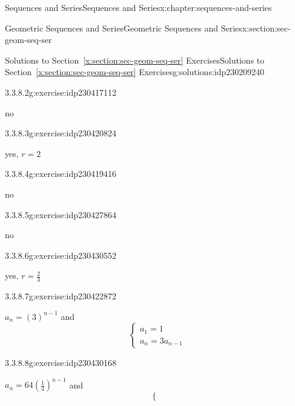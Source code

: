 \documentclass[twoside,10pt,]{book}
\newcommand{\xreffont}{\relax}
\numberwithin{equation}{section}
\begin{document}
\begin{chapterptx}{Sequences and Series}{}{Sequences and Series}{}{}{x:chapter:sequences-and-series}
\begin{sectionptx}{Geometric Sequences and Series}{}{Geometric Sequences and Series}{}{}{x:section:sec-geom-seq-ser}
\begin{solutions-subsection}{Solutions to Section~{\xreffont\ref*{x:section:sec-geom-seq-ser}} Exercises}{}{Solutions to Section~{\xreffont\ref*{x:section:sec-geom-seq-ser}} Exercises}{}{}{g:solutions:idp230209240}
\begin{exercisegroup}
\begin{divisionsolutioneg}{3.3.8.2}{}{g:exercise:idp230417112}%
\par\smallskip%
\noindent\hypertarget{g:solution:idp230418264-main}{}no\end{divisionsolutioneg}%
\begin{divisionsolutioneg}{3.3.8.3}{}{g:exercise:idp230420824}%
\par\smallskip%
\noindent\hypertarget{g:solution:idp230418520-main}{}yes, \(r=2\)\end{divisionsolutioneg}%
\begin{divisionsolutioneg}{3.3.8.4}{}{g:exercise:idp230419416}%
\par\smallskip%
\noindent\hypertarget{g:solution:idp230421592-main}{}no\end{divisionsolutioneg}%
\begin{divisionsolutioneg}{3.3.8.5}{}{g:exercise:idp230427864}%
\par\smallskip%
\noindent\hypertarget{g:solution:idp230424152-main}{}no\end{divisionsolutioneg}%
\begin{divisionsolutioneg}{3.3.8.6}{}{g:exercise:idp230430552}%
\par\smallskip%
\noindent\hypertarget{g:solution:idp230429016-main}{}yes, \(r=\frac{2}{3}\)\end{divisionsolutioneg}%
\end{exercisegroup}
\par\medskip\noindent
\begin{exercisegroup}
\begin{divisionsolutioneg}{3.3.8.7}{}{g:exercise:idp230422872}%
\par\smallskip%
\noindent\hypertarget{g:solution:idp230424280-main}{}\({a_n} = {\left( 3 \right)^{n - 1}}\) and%
\begin{equation*}
\left\{ \begin{array}{l}
{a_1} = 1\\
{a_n} = 3{a_{n - 1}}
\end{array} \right.
\end{equation*}
\end{divisionsolutioneg}%
\begin{divisionsolutioneg}{3.3.8.8}{}{g:exercise:idp230430168}%
\par\smallskip%
\noindent\hypertarget{g:solution:idp230424536-main}{}\({a_n} = 64{\left( {\frac{1}{4}} \right)^{n - 1}}\) and%
\begin{equation*}
\left\{ \begin{array}{l}

\end{array}
\end{equation*}
\end{divisionsolutioneg}
\end{exercisegroup}
\end{solutions-subsection}
\end{sectionptx}
\end{chapterptx}
\end{document}
